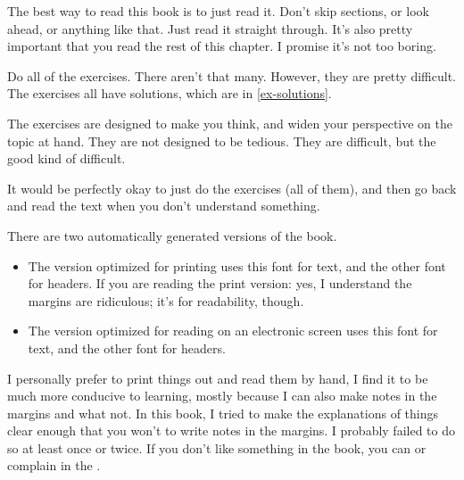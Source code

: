 
The best way to read this book is to just read it. Don't skip sections, or look
ahead, or anything like that. Just read it straight through. It's also pretty
important that you read the rest of this chapter. I promise it's not too boring.

Do all of the exercises. There aren't that many. However, they are pretty
difficult. The exercises all have solutions, which are in \cref{ex-solutions}.

The exercises are designed to make you think, and widen your perspective on the
topic at hand. They are not designed to be tedious. They are difficult, but the
good kind of difficult.

It would be perfectly okay to just do the exercises (all of them), and then go
back and read the text when you don't understand something.

There are two automatically generated versions of the book.

\begin{itemize}
  \item {\rmfamily The version optimized for printing uses this font for text,
      and the other font for headers.} If you are reading the print version:
    yes, I understand the margins are ridiculous; it's for readability, though.
  \item {\sffamily The version optimized for reading on an electronic screen
      uses this font for text, and the other font for headers.}
\end{itemize}

I personally prefer to print things out and read them by hand, I find it to be
much more conducive to learning, mostly because I can also make notes in the
margins and what not. In this book, I tried to make the explanations of things
clear enough that you won't  to write notes in the margins. I probably
failed to do so at least once or twice. If you don't like something in the book,
you can \emailme or complain in the \bugtracker .
